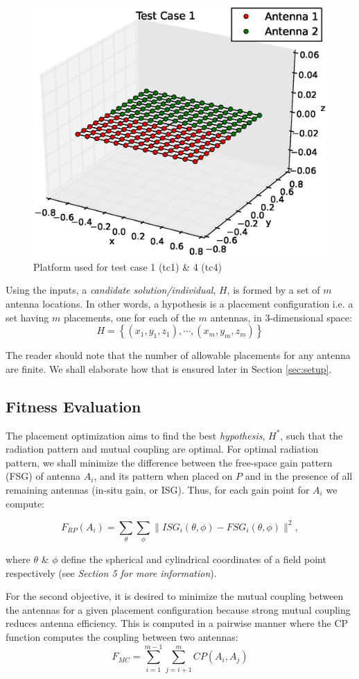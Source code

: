 \documentclass{sig-alternate}
\begin{document}
\begin{figure}
    \begin{center}
        \includegraphics[width=.41\textwidth]{FIG/tc_1_figure}
\end{center}
\caption{Platform used for test case 1 (tc1) \& 4 (tc4)}
\label{fig:plat1}
\end{figure}

Using the inputs, a \textit{candidate solution/individual}, $H$, is formed by a set of $m$ antenna locations. In other words, a hypothesis is a placement configuration i.e. a set having $m$ placements, one for each of the $m$ antennas, in 3-dimensional space:
\[
    H  = \left\{(x_1, y_1, z_1), \cdots, (x_m, y_m, z_m)\right\}
\]

The reader should note that the number of allowable placements for any antenna are finite. We shall elaborate how that is ensured later in Section \ref{sec:setup}.

\subsection{Fitness Evaluation}
The placement optimization aims to find the best \textit{hypothesis}, $H^*$, such that the radiation pattern and mutual coupling are optimal. For optimal radiation pattern, we shall minimize the difference between the free-space gain pattern (FSG) of antenna $A_i$, and its pattern when placed on $P$ and in the presence of all remaining antennas (in-situ gain, or ISG).  Thus, for each gain point for $A_i$ we compute:

\begin{equation} \label{eq:rp}
  F_{RP}(A_i) = \sum_{\theta}\sum_{\phi} 
           \| ISG_i(\theta,\phi) - FSG_i(\theta,\phi) \| ^2,
\end{equation}

where $\theta$ \& $\phi$ define the spherical and cylindrical coordinates of a field point respectively (see \textit{Section 5 for more information}).

For the second objective, it is desired to minimize the mutual coupling between the antennas for a given placement configuration because strong mutual coupling reduces antenna efficiency. This is computed in a pairwise manner where the CP function computes the coupling between two antennas:
\begin{equation}
  F_{MC} = \sum_{i=1}^{m-1}\sum_{j=i+1}^{m} CP(A_i, A_j)
\end{equation}
\end{document}
